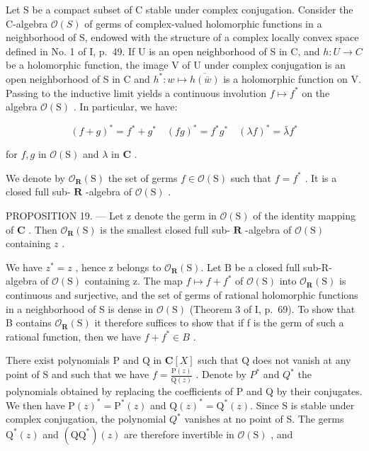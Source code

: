Let S be a compact subset of C stable under complex conjugation. Consider the C-algebra \(\mathcal{O}(S)\) of germs of complex-valued holomorphic functions in a neighborhood of S, endowed with the structure of a complex locally convex space defined in No. 1 of I, p.~49. If U is an open neighborhood of S in C, and \(h: U \to C\) be a holomorphic function, the image V of U under complex conjugation is an open neighborhood of S in C and \(h^{*}: w \mapsto \overline{h(\overline{w})}\) is a holomorphic function on V. Passing to the inductive limit yields a continuous involution \(f\mapsto f^{*}\) on the algebra \(\mathcal{O}(\mathrm{S})\) . In particular, we have:

\[
(f + g) ^ {*} = f ^ {*} + g ^ {*} \quad (f g) ^ {*} = f ^ {*} g ^ {*} \quad (\lambda f) ^ {*} = \bar {\lambda} f ^ {*}
\]

for \(f,g\) in \(\mathcal{O}(\mathrm{S})\) and \(\lambda\) in \(\mathbf{C}\) .

We denote by \(\mathcal{O}_{\mathbf{R}}(\mathrm{S})\) the set of germs \(f \in \mathcal{O}(\mathrm{S})\) such that \(f = f^{*}\) . It is a closed full sub- \(\mathbf{R}\) -algebra of \(\mathcal{O}(\mathrm{S})\) .

PROPOSITION 19. --- Let z denote the germ in \(\mathcal{O}(\mathrm{S})\) of the identity mapping of \(\mathbf{C}\) . Then \(\mathcal{O}_{\mathbf{R}}(\mathrm{S})\) is the smallest closed full sub- \(\mathbf{R}\) -algebra of \(\mathcal{O}(\mathrm{S})\) containing \(z\) .

We have \(z^{*} = z\) , hence z belongs to \(\mathcal{O}_{\mathbf{R}}(\mathrm{S})\). Let B be a closed full sub-R-algebra of \(\mathcal{O}(\mathrm{S})\) containing z. The map \(f \mapsto f + f^{*}\) of \(\mathcal{O}(\mathrm{S})\) into \(\mathcal{O}_{\mathbf{R}}(\mathrm{S})\) is continuous and surjective, and the set of germs of rational holomorphic functions in a neighborhood of S is dense in \(\mathcal{O}(\mathrm{S})\) (Theorem 3 of I, p.~69). To show that B contains \(\mathcal{O}_{\mathbf{R}}(\mathrm{S})\) it therefore suffices to show that if f is the germ of such a rational function, then we have \(f + f^{*} \in B\) .

There exist polynomials P and Q in \(\mathbf{C}[X]\) such that Q does not vanish at any point of S and such that we have \(f = \frac{\mathrm{P}(z)}{\mathrm{Q}(z)}\) . Denote by \(P^{*}\) and \(Q^{*}\) the polynomials obtained by replacing the coefficients of P and Q by their conjugates. We then have \(\mathrm{P}(z)^{*} = \mathrm{P}^{*}(z)\) and \(\mathrm{Q}(z)^{*} = \mathrm{Q}^{*}(z)\). Since S is stable under complex conjugation, the polynomial \(Q^{*}\) vanishes at no point of S. The germs \(\mathrm{Q}^{*}(z)\) and \((\mathrm{QQ}^{*})(z)\) are therefore invertible in \(\mathcal{O}(\mathrm{S})\) , and

